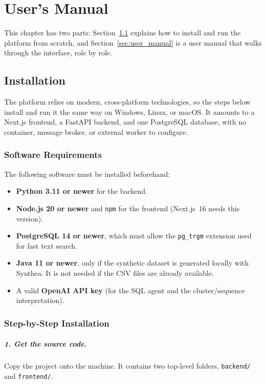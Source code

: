 \chapter{User's Manual}
\label{ch:manual}
\pagestyle{fancy}

This chapter has two parts: Section~\ref{sec:installation} explains how to install and run the platform from scratch, and Section~\ref{sec:user_manual} is a user manual that walks through the interface, role by role.

\section{Installation}
\label{sec:installation}

The platform relies on modern, cross-platform technologies, so the steps below install and run it the same way on Windows, Linux, or macOS. It amounts to a Next.js frontend, a FastAPI backend, and one PostgreSQL database, with no container, message broker, or external worker to configure.

\subsection{Software Requirements}

The following software must be installed beforehand:

\begin{itemize}
    \item \textbf{Python 3.11 or newer} for the backend.
    \item \textbf{Node.js 20 or newer} and \texttt{npm} for the frontend (Next.js~16 needs this version).
    \item \textbf{PostgreSQL 14 or newer}, which must allow the \texttt{pg\_trgm} extension used for fast text search.
    \item \textbf{Java 11 or newer}, only if the synthetic dataset is generated locally with Synthea. It is not needed if the CSV files are already available.
    \item A valid \textbf{OpenAI API key} (for the SQL agent and the cluster/sequence interpretation).
\end{itemize}

\subsection{Step-by-Step Installation}

\paragraph{1. Get the source code.} Copy the project onto the machine. It contains two top-level folders, \texttt{backend/} and \texttt{frontend/}.


